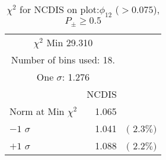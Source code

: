  \begin{table}[h!]\centering
 {\small{
 \begin{tabular}{||l||r||r||}
 \hline
 \hline
\multicolumn{2}{||c||}{$\chi^{2}$ Min  29.310} & \\
 \multicolumn{2}{||c||}{Number of bins used:   18.} & \\
\multicolumn{2}{||c||}{One $\sigma$:    1.276} & \\
 \hline
 \hline
    & NCDIS & \\
Norm at Min $\chi^{2}$  &   1.065 & \\
$-1$ $\sigma$ &   1.041  &  $($  2.3$\%)$  \\
$+1$ $\sigma$ &   1.088  &  $($  2.2$\%)$  \\
 \hline
 \hline
 \end{tabular}
 \caption{$\chi^{2}$ for NCDIS on plot:$\phi_{12}$ (\ztrz $> 0.075$), $P_\pm \geq 0.5$}
 \label{tab-chinc}
 }}
 \end{table}
 \endinput
